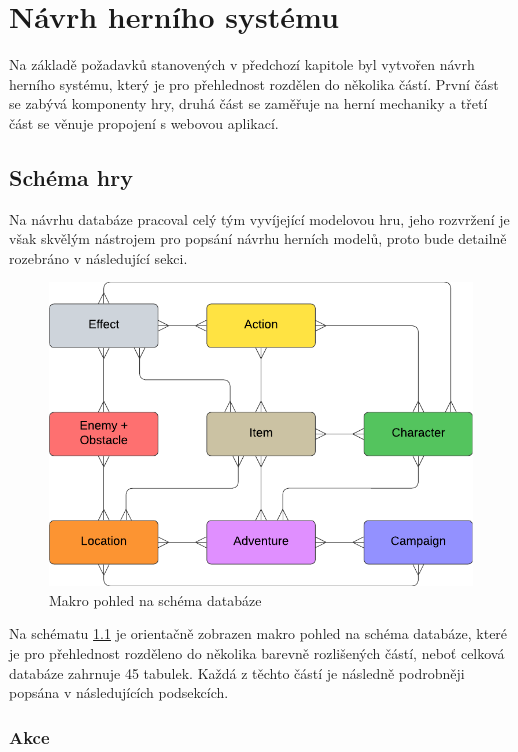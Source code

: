 \chapter{Návrh herního systému}
\label{chap:design}

Na základě požadavků stanovených v předchozí kapitole byl vytvořen návrh herního systému, který je pro přehlednost rozdělen do několika částí. První část se zabývá komponenty hry, druhá část se zaměřuje na herní mechaniky a třetí část se věnuje propojení s webovou aplikací.


\section{Schéma hry}
\label{sec:design_scheme}

Na návrhu databáze pracoval celý tým vyvíjející modelovou hru, jeho rozvržení je však skvělým nástrojem pro popsání návrhu herních modelů, proto bude detailně rozebráno v následující sekci.

\begin{figure}[h]
    \centering
    \includegraphics{../../shared/diagrams/er_macro.pdf}
    \caption{Makro pohled na schéma databáze}
    \label{diag:er_macro}
\end{figure}

Na schématu \ref{diag:er_macro} je orientačně zobrazen makro pohled na schéma databáze, které je pro přehlednost rozděleno do několika barevně rozlišených částí, neboť celková databáze zahrnuje 45 tabulek. Každá z těchto částí je následně podrobněji popsána v následujících podsekcích.


\subsection{Akce}
\label{subsec:schema_actions}

